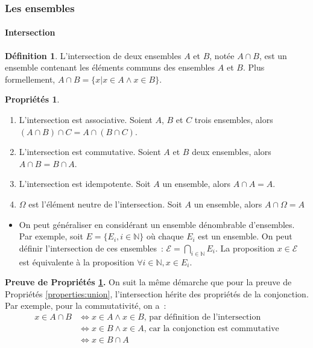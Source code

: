 \documentclass[10pt,notheorems]{beamer}
\theoremstyle{plain}
\theoremstyle{definition} %
\newtheorem{definition}{Définition}
\newtheorem{properties}{Propriétés}
\begin{document}
\begin{frame}
  \frametitle{Les ensembles}
  \framesubtitle{Intersection}
  \hypertarget{slide_ensembles_intersection}{}

  \begin{definition}\label{def:intersection} L'intersection de deux ensembles $A$ et $B$, notée $A\cap B$, est un ensemble contenant les éléments communs des ensembles $A$ et $B$. Plus formellement, $A \cap B = \{x | x \in A \land x\in B\}$.
  \end{definition}

  \bigskip

  \begin{properties}\label{properties:intersection}
    \begin{enumerate}
    \item L'intersection est associative. Soient $A$, $B$ et $C$ trois ensembles, alors $(A\cap B)\cap C = A\cap (B\cap C)$.
    \item L'intersection est commutative. Soient $A$ et $B$ deux ensembles, alors $A \cap B = B \cap A$.
    \item L'intersection est idempotente. Soit $A$ un ensemble, alors $A \cap A = A$.
    \item $\Omega$ est l'élément neutre de l'intersection. Soit $A$ un ensemble, alors $A\cap\Omega=A$
    \end{enumerate}
  \end{properties}

\end{frame}


\begin{notes}
  \begin{itemize}
  \item On peut généraliser en considérant un ensemble dénombrable d'ensembles. Par exemple, soit $E = \{E_i, i\in \mathbb N\}$ où chaque $E_i$ est un ensemble. On peut définir l'intersection de ces ensembles~: $\mathcal E = \bigcap_{i\in\mathbb N}E_i$. La proposition  $x\in\mathcal E$ est équivalente à la proposition $\forall i\in\mathbb N, x\in E_i$.
  \end{itemize}

  \bigskip

  \textbf{Preuve de Propriétés \hyperlink{slide_ensembles_intersection}{\ref{properties:intersection}}.} On suit la même démarche que pour la preuve de Propriétés \hyperlink{slide_ensembles_union}{\ref{properties:union}}, l'intersection hérite des propriétés de la conjonction. Par exemple, pour la commutativité, on a :
  \[
    \begin{split}
      x \in A \cap B &\Leftrightarrow x \in A \land x\in B \text{, par définition de l'intersection}\\
      &\Leftrightarrow x \in B \land x\in A \text{, car la conjonction est commutative}\\
      &\Leftrightarrow x \in B\cap A
    \end{split}
  \]

\end{notes}
\end{document}
